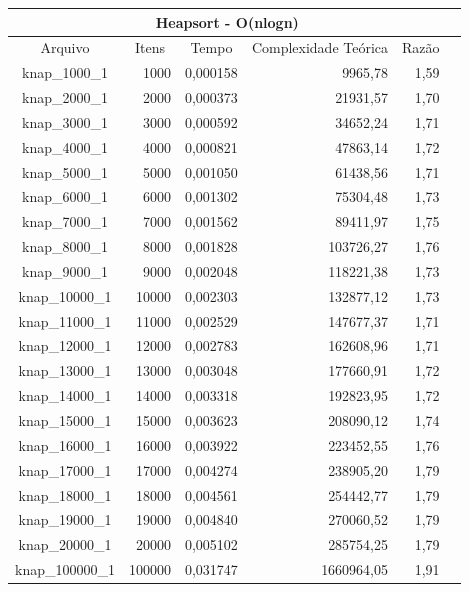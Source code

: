 \documentclass[
	12pt,				%
	oneside,			%
	a4paper,			%
	english,			%
	french,				%
	spanish,			%
	brazil,				%
	]{abntex2}
\begin{document}
\begin{longtable}{|c|r|r|r|r|r|}
\toprule
\multicolumn{5}{|c|}{\cellcolor{gray!25}\textbf{Heapsort - O(nlogn)}}\\
\midrule
\multicolumn{1}{|c|}{\cellcolor{gray!10}Arquivo} & \multicolumn{1}{|c|}{\cellcolor{gray!10}Itens} &  \multicolumn{1}{|c|}{\cellcolor{gray!10}Tempo} &
\multicolumn{1}{|c|}{\cellcolor{gray!10}Complexidade Teórica} &
\multicolumn{1}{|c|}{\cellcolor{gray!10}Razão}\\ \hline
knap\_1000\_1	&	1000	&	0,000158	&	9965,78	&	1,59	 \\ \hline
knap\_2000\_1	&	2000	&	0,000373	&	21931,57	&	1,70	 \\ \hline
knap\_3000\_1	&	3000	&	0,000592	&	34652,24	&	1,71	 \\ \hline
knap\_4000\_1	&	4000	&	0,000821	&	47863,14	&	1,72	 \\ \hline
knap\_5000\_1	&	5000	&	0,001050	&	61438,56	&	1,71	 \\ \hline
knap\_6000\_1	&	6000	&	0,001302	&	75304,48	&	1,73	 \\ \hline
knap\_7000\_1	&	7000	&	0,001562	&	89411,97	&	1,75	 \\ \hline
knap\_8000\_1	&	8000	&	0,001828	&	103726,27	&	1,76	 \\ \hline
knap\_9000\_1	&	9000	&	0,002048	&	118221,38	&	1,73	 \\ \hline
knap\_10000\_1	&	10000	&	0,002303	&	132877,12	&	1,73	 \\ \hline
knap\_11000\_1	&	11000	&	0,002529	&	147677,37	&	1,71	 \\ \hline
knap\_12000\_1	&	12000	&	0,002783	&	162608,96	&	1,71	 \\ \hline
knap\_13000\_1	&	13000	&	0,003048	&	177660,91	&	1,72	 \\ \hline
knap\_14000\_1	&	14000	&	0,003318	&	192823,95	&	1,72	 \\ \hline
knap\_15000\_1	&	15000	&	0,003623	&	208090,12	&	1,74	 \\ \hline
knap\_16000\_1	&	16000	&	0,003922	&	223452,55	&	1,76	 \\ \hline
knap\_17000\_1	&	17000	&	0,004274	&	238905,20	&	1,79	 \\ \hline
knap\_18000\_1	&	18000	&	0,004561	&	254442,77	&	1,79	 \\ \hline
knap\_19000\_1	&	19000	&	0,004840	&	270060,52	&	1,79	 \\ \hline
knap\_20000\_1	&	20000	&	0,005102	&	285754,25	&	1,79	 \\ \hline
knap\_100000\_1	&	100000	&	0,031747	&	1660964,05	&	1,91	 \\ \hline


\end{longtable}
 
\end{document}
